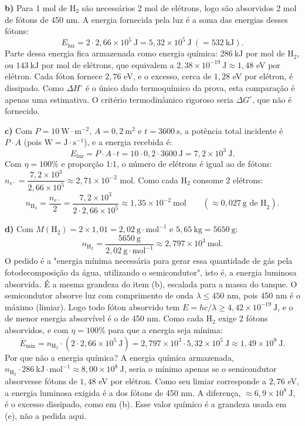 \documentclass{article}%
\begin{document}
\textbf{b)} Para 1 mol de $\text{H}_2$ são necessários 2 mol de elétrons, logo são absorvidos 2 mol de fótons de 450 nm. A energia fornecida pela luz é a soma das energias desses fótons:
\[
E_{\text{luz}}=2\cdot 2{,}66\times10^{5}\ \text{J}=5{,}32\times10^{5}\ \text{J}\ (=532\ \text{kJ}).
\]
Parte dessa energia fica armazenada como energia química: $286\ \text{kJ}$ por mol de $\text{H}_2$, ou $143\ \text{kJ}$ por mol de elétrons, que equivalem a $2{,}38\times10^{-19}\ \text{J}\approx 1{,}48$ eV por elétron. Cada fóton fornece $2{,}76$ eV, e o excesso, cerca de $1{,}28$ eV por elétron, é dissipado. Como $\Delta H^{\circ}$ é o único dado termoquímico da prova, esta comparação é apenas uma estimativa. O critério termodinâmico rigoroso seria $\Delta G^{\circ}$, que não é fornecido.

\textbf{c)} Com $P=10\ \text{W}\cdot\text{m}^{-2}$, $A=0{,}2\ \text{m}^{2}$ e $t=3600\ \text{s}$, a potência total incidente é $P\cdot A$ (pois $\text{W}=\text{J}\cdot\text{s}^{-1}$), e a energia recebida é:
\[
E_{\text{luz}}=P\cdot A\cdot t=10\cdot 0{,}2\cdot 3600\ \text{J}=7{,}2\times10^{3}\ \text{J}.
\]
Com $\eta=100\%$ e proporção 1:1, o número de elétrons é igual ao de fótons: $n_{e^-}=\dfrac{7{,}2\times10^{3}}{2{,}66\times10^{5}}\approx 2{,}71\times10^{-2}$ mol. Como cada $\text{H}_2$ consome 2 elétrons:
\[
n_{\text{H}_2}=\frac{n_{e^-}}{2}=\frac{7{,}2\times10^{3}}{2\cdot 2{,}66\times10^{5}}\approx 1{,}35\times10^{-2}\ \text{mol}\qquad(\approx 0{,}027\ \text{g de H}_2).
\]

\textbf{d)} Com $M(\text{H}_2)=2\times1{,}01=2{,}02\ \text{g}\cdot\text{mol}^{-1}$ e $5{,}65\ \text{kg}=5650\ \text{g}$:
\[
n_{\text{H}_2}=\frac{5650\ \text{g}}{2{,}02\ \text{g}\cdot\text{mol}^{-1}}\approx 2{,}797\times10^{3}\ \text{mol}.
\]
O pedido é a "energia mínima necessária para gerar essa quantidade de gás pela fotodecomposição da água, utilizando o semicondutor", isto é, a energia luminosa absorvida. É a mesma grandeza do item (b), escalada para a massa do tanque. O semicondutor absorve luz com comprimento de onda $\lambda\le 450$ nm, pois 450 nm é o máximo (limiar). Logo todo fóton absorvido tem $E=hc/\lambda\ge 4{,}42\times10^{-19}\ \text{J}$, e o de menor energia absorvível é o de 450 nm. Como cada $\text{H}_2$ exige 2 fótons absorvidos, e com $\eta=100\%$ para que a energia seja mínima:
\[
E_{\min}=n_{\text{H}_2}\cdot\left(2\cdot 2{,}66\times10^{5}\ \text{J}\right)=2{,}797\times10^{3}\cdot 5{,}32\times10^{5}\ \text{J}\approx 1{,}49\times10^{9}\ \text{J}.
\]
Por que não a energia química? A energia química armazenada, $n_{\text{H}_2}\cdot 286\ \text{kJ}\cdot\text{mol}^{-1}\approx 8{,}00\times10^{8}\ \text{J}$, seria o mínimo apenas se o semicondutor absorvesse fótons de $1{,}48$ eV por elétron. Como seu limiar corresponde a $2{,}76$ eV, a energia luminosa exigida é a dos fótons de 450 nm. A diferença, $\approx 6{,}9\times10^{8}\ \text{J}$, é o excesso dissipado, como em (b). Esse valor químico é a grandeza usada em (e), não a pedida aqui.
\end{document}
